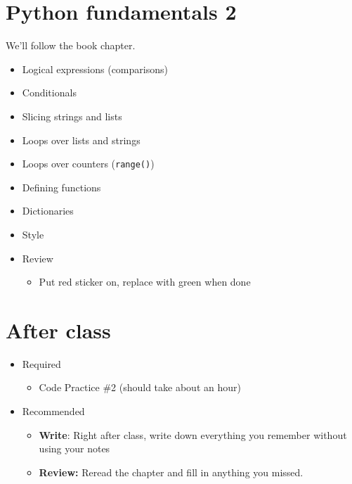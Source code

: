 \documentclass[11pt]{article}
\begin{document}
\section*{Python fundamentals 2} 

We'll follow the book chapter.
\begin{itemize} 
\item Logical expressions (comparisons) 
\item Conditionals 
\item Slicing strings and lists 
\item Loops over lists and strings 
\item Loops over counters ({\tt range()}) 
\item Defining functions 
\item Dictionaries 
\item Style 
\item Review 
\begin{itemize}
\item Put red sticker on, replace with green when done 
\end{itemize} 
\end{itemize} 

\section*{After class}

\begin{itemize}
\item Required
\begin{itemize}
\item Code Practice \#2 (should take about an hour) 
\end{itemize}
\item Recommended
\begin{itemize}
\item {\bf Write}:  Right after class, write down everything you remember without using your notes 
\item {\bf Review:} Reread the chapter and fill in anything you missed.  
\end{itemize}
\end{itemize}


\end{document}
